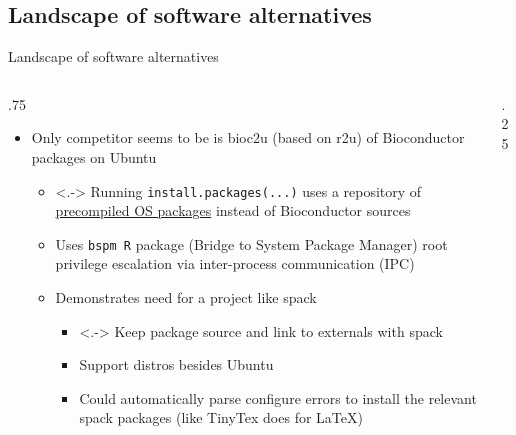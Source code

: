 \documentclass[
aspectratio=169,
xcolor={usenames}
]{beamer}
\begin{document}
\subsection{Landscape of software alternatives}
\begin{frame}{\hspace{8cm}Landscape of software alternatives}
  \begin{columns}[T]
    \begin{column}{.75\framewidth}
      \begin{itemize}[<+->]
      \item Only competitor seems to be %
        is bioc2u (based on r2u) %
        of Bioconductor packages on Ubuntu
        \begin{itemize}
        \item<.-> Running %
          \texttt{install.packages(...)} %
          uses a repository of
          \ul{precompiled OS packages} instead of Bioconductor sources
        \item Uses \texttt{bspm R} package (Bridge to System Package Manager)
          root privilege escalation via inter-process communication (IPC)
        \item Demonstrates need for a project like spack
          \begin{itemize}
          \item<.-> Keep package source and link to externals with spack
          \item Support distros besides Ubuntu
          \item Could automatically parse configure errors %
            to install the relevant spack packages %
            (like TinyTex does for LaTeX)
          \end{itemize}
        \end{itemize}
      \end{itemize}
    \end{column}
    \begin{column}{.25\framewidth}
\end{column}
\end{columns}
\end{frame}
\end{document}
